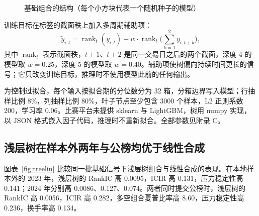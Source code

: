 \documentclass[UTF8,a4paper,zihao=-4,fontset=none]{ctexart}
\begin{document}
\begin{figure}[htbp]
\caption{基础组合的结构（每个小方块代表一个随机种子的模型）}\label{fig:ensemble}
\centering
{}
\end{figure}

训练目标在标签的截面秩上加入多周期辅助项：
\begin{equation}
\tilde y_{i,t}=\operatorname{rank}_t\!\left(y_{i,t}\right)+w\cdot\operatorname{rank}_t\!\Big(\sum_{k=1}^{2}y_{i,t+k}\Big),
\end{equation}
其中 $\operatorname{rank}_t$ 表示截面秩，$t+1$、$t+2$ 是同一交易日之后的两个截面，深度 4 的模型取 $w=0.25$，深度 5 的模型取 $w=0.40$。辅助项使树偏向持续时间更长的信号；它只改变训练目标，推理时不使用模型此前的任何输出。

为控制过拟合，每个输入按拟合期的分位数分为 32 箱，分箱边界写入模型；行抽样比例 8\%，列抽样比例 80\%，叶子节点至少包含 3000 个样本，L2 正则系数 200，学习率 0.06。比赛平台未提供 sklearn 与 LightGBM，树用 numpy 实现，以 JSON 格式嵌入因子代码，推理时不重新拟合。全部参数见附录 C。

\subsection{浅层树在样本外两年与公榜均优于线性合成}\label{sec:treeoos}

图表~\ref{fig:treelin} 比较同一批基础信号下浅层树组合与线性合成的表现。在本地样本外的 2023 年，浅层树的 RankIC 高 0.0095，ICIR 高 0.131，压力稳定性高 0.141；2024 年分别高 0.0086、0.127、0.074。两者同时提交公榜时，浅层树的 RankIC 高 0.0056，ICIR 高 0.282，多空组合夏普比率高 8.60，压力稳定性高 0.236，换手率高 0.134。
\end{document}
